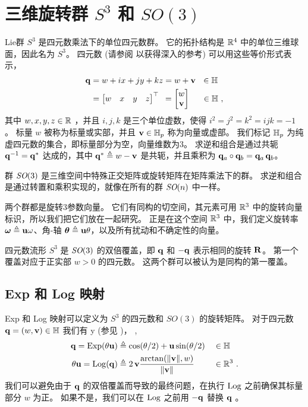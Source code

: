 
\section{三维旋转群 $S^3$ 和 $SO(3)$}
\label{sec:S3_SO3}

Lie群 $S^3$ 是四元数乘法下的单位四元数群。
它的拓扑结构是 ${\mathbb R}^4$ 中的单位三维球面，因此名为 $S^3$。
四元数 (请参阅 \cite{SOLA-17-Quaternion} 以获得深入的参考) 可以用这些等价形式表示，
%
\begin{align}
\begin{split}		
{\bf q} 
&= w+ix+jy+kz
=w+{\bf v} ~~ \in{\mathbb H}
\\
&
=\begin{bmatrix}w&x&y&z\end{bmatrix}^{\top} 
~\,=\begin{bmatrix}w\\{\bf v}\end{bmatrix} \quad~\, \in{\mathbb H}
~,
\end{split}
\end{align}
%
其中 $w,x,y,z\in{\mathbb R}$ ，并且 $i,j,k$ 是三个单位虚数，使得 $i^2=j^2=k^2=ijk=-1$ 。
标量 $w$ 被称为标量或实部，并且 ${\bf v}\in{\mathbb H}_p$ 称为向量或虚部。
我们标记 ${\mathbb H}_p$ 为纯虚四元数的集合，即标量部分为空，向量维数为3。
求逆和组合是通过共轭 ${\bf q}^{-1} = {\bf q}^*$ 达成的，其中 ${\bf q}^*\triangleq w-{\bf v}$ 是共轭，并且乘积为 ${\bf q}_a\circ{\bf q}_b = {\bf q}_a\,{\bf q}_b$。

群 $\textit{SO}(3)$ 是三维空间中特殊正交矩阵或旋转矩阵在矩阵乘法下的群。
求逆和组合是通过转置和乘积实现的，就像在所有的群 $\textit{SO}(n)$ 中一样。

两个群都是旋转$3$参数向量。 
它们有同构的切空间，其元素可用 ${\mathbb R}^3$ 中的旋转向量标识，所以我们把它们放在一起研究。
正是在这个空间 ${\mathbb R}^3$ 中，我们定义旋转率  ${{\bm \omega}}\triangleq{\bf u}\omega$、角-轴 ${{\bm \theta}}\triangleq{\bf u}\theta$，以及所有扰动和不确定性的向量。

四元数流形 $S^3$ 是 $\textit{SO}(3)$ 的双倍覆盖，即 ${\bf q}$ 和 $-{\bf q}$ 表示相同的旋转 ${\bf R}$。
第一个覆盖对应于正实部 $w>0$ 的四元数。
这两个群可以被认为是同构的第一覆盖。




\subsection{Exp 和 Log 映射}

Exp 和 Log 映射可以定义为 $S^3$ 的四元数和 $SO(3)$ 的旋转矩阵。
对于四元数 ${\bf q}=(w,{\bf v})\in{\mathbb H}$ 我们有%
%
\if \examples y (参见 )， \else, \fi
%
%
\begin{align}
{\bf q}= \operatorname*{Exp}(\theta{\bf u}) &\triangleq \cos(\theta/2) + {\bf u}\sin(\theta/2) &&\in{\mathbb H}\\ 
\theta{\bf u} = \operatorname*{Log}({\bf q}) &\triangleq 2\,{\bf v}\frac{\arctan({{\left\|{\bf v}\right\|},w})}{{\left\|{\bf v}\right\|}}&&\in{\mathbb R}^3
~.
\end{align}
%
我们可以避免由于 ${\bf q}$ 的双倍覆盖而导致的最终问题，在执行 $\operatorname*{Log}$ 之前确保其标量部分 $w$ 为正。
如果不是，我们可以在 $\operatorname*{Log}$ 之前用 $-{\bf q}$ 替换 ${\bf q}$ 。

